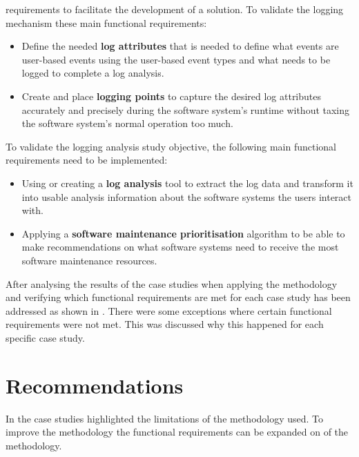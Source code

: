 \begin{enumerate}[label=\textbf{\Roman*.}]
	requirements to facilitate the development of a solution. To validate the logging mechanism
	these main functional requirements:
	 \begin{itemize}
		\item Define the needed \textbf{log attributes} that is needed to define what events are
		user-based events using the user-based event types and what needs to be logged to complete a
		log analysis.
		\item Create and place \textbf{logging points} to capture the desired log attributes
		accurately and precisely during the software system's runtime without taxing the software
		system's normal operation too much.
	 \end{itemize}

	 To validate the logging analysis study objective, the following main functional requirements
	 need to be implemented:
	 \begin{itemize}
		\item Using or creating a \textbf{log analysis} tool to extract the log data and transform
		it into usable analysis information about the software systems the users interact with.
		\item Applying a \textbf{software maintenance prioritisation} algorithm to be able to make
		recommendations on what software systems need to receive the most software maintenance
		resources.
	 \end{itemize}

	 After analysing the results of the case studies when applying the methodology and verifying
	 which functional requirements are met for each case study has been addressed as shown in
	 . There were some exceptions where certain functional
	 requirements were not met. This was discussed why this happened for each specific case study.
\end{enumerate}

\section{Recommendations}
In  the case studies highlighted the limitations of the methodology used.
To improve the methodology the functional requirements can be expanded on of the methodology.

